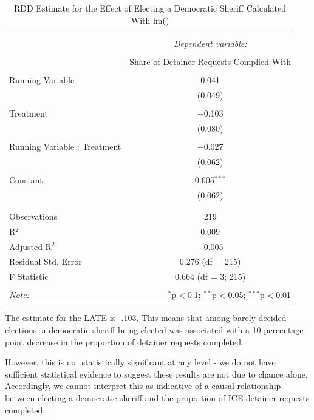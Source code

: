 \documentclass{article}\usepackage[]{graphicx}\usepackage[]{color}
\begin{document}
\begin{table}[H] \centering 
  \caption{RDD Estimate for the Effect of Electing a Democratic Sheriff Calculated With lm()} 
  \label{q5} 
\begin{tabular}{@{\extracolsep{5pt}}lc} 
\\[-1.8ex]\hline 
\hline \\[-1.8ex] 
 & \multicolumn{1}{c}{\textit{Dependent variable:}} \\ 
\cline{2-2} 
\\[-1.8ex] & Share of Detainer Requests Complied With \\ 
\hline \\[-1.8ex] 
 Running Variable & 0.041 \\ 
  & (0.049) \\ 
  & \\ 
 Treatment & $-$0.103 \\ 
  & (0.080) \\ 
  & \\ 
 Running Variable : Treatment & $-$0.027 \\ 
  & (0.062) \\ 
  & \\ 
 Constant & 0.605$^{***}$ \\ 
  & (0.062) \\ 
  & \\ 
\hline \\[-1.8ex] 
Observations & 219 \\ 
R$^{2}$ & 0.009 \\ 
Adjusted R$^{2}$ & $-$0.005 \\ 
Residual Std. Error & 0.276 (df = 215) \\ 
F Statistic & 0.664 (df = 3; 215) \\ 
\hline 
\hline \\[-1.8ex] 
\textit{Note:}  & \multicolumn{1}{r}{$^{*}$p$<$0.1; $^{**}$p$<$0.05; $^{***}$p$<$0.01} \\ 
\end{tabular} 
\end{table} 


The estimate for the LATE is -.103.
This means that among barely decided elections, a democratic sheriff being elected was associated with a 10 percentage-point decrease in the proportion of detainer requests completed.

However, this is not statistically significant at any level - we do not have sufficient statistical evidence to suggest these results are not due to chance alone.
Accordingly, we cannot interpret this as indicative of a causal relationship between electing a democratic sheriff and the proportion of ICE detainer requests completed.
\end{document}
